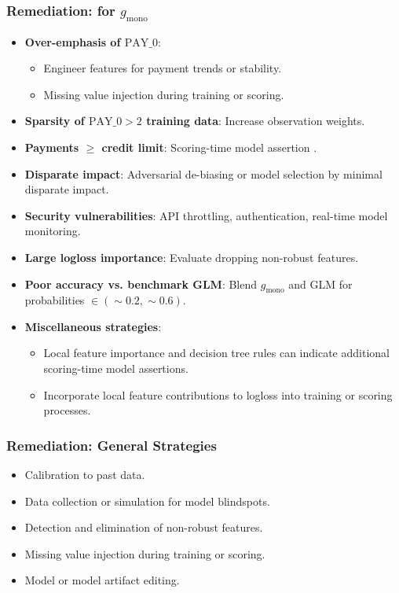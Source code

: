 \documentclass[11pt,
               aspectratio=43,
               hyperref={colorlinks}
               ]{beamer}
\begin{document}
			\begin{frame}
		
				\frametitle{\textbf{Remediation}: for $g_{\text{mono}}$}
				
				\begin{itemize}\scriptsize
					\item \textbf{Over-emphasis of $\text{PAY\_0}$}:
					\begin{itemize}\scriptsize
						\item Engineer features for payment trends or stability.
						\item Missing value injection during training or scoring.
					\end{itemize}
					\item \textbf{Sparsity of $\text{PAY\_0} > 2$ training data}: Increase observation weights. 
					\item \textbf{Payments $\geq$ credit limit}: Scoring-time model assertion \cite{kangdebugging}. 
					\item \textbf{Disparate impact}: Adversarial de-biasing \cite{zhang2018mitigating} or model selection by minimal disparate impact. 
					\item \textbf{Security vulnerabilities}: API throttling, authentication, real-time model monitoring. 
					\item \textbf{Large logloss importance}: Evaluate dropping non-robust features.
					\item \textbf{Poor accuracy vs. benchmark GLM}: Blend $g_{\text{mono}}$ and GLM for probabilities $\in (\sim0.2, \sim0.6)$.
					\item \textbf{Miscellaneous strategies}: 
					\begin{itemize}\scriptsize
						\item Local feature importance and decision tree rules can indicate additional scoring-time model assertions.
						\item Incorporate local feature contributions to logloss into training or scoring processes.
					\end{itemize}
				\end{itemize}
				\normalsize

			\end{frame}		
			
			\begin{frame}
		
				\frametitle{\textbf{Remediation}: General Strategies}

				\begin{itemize}
					\item Calibration to past data.
					\item Data collection or simulation for model blindspots.
					\item Detection and elimination of non-robust features.
					\item Missing value injection during training or scoring.
					\item Model or model artifact editing.
				\end{itemize}				
				
			\end{frame}
\end{document}
